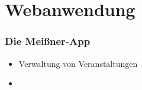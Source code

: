 \section{Webanwendung}

\begin{frame}
	\frametitle{Die Meißner-App}
    \begin{itemize}
    	\item Verwaltung von Veranstaltungen
    	\item 
    \end{itemize}


\end{frame}